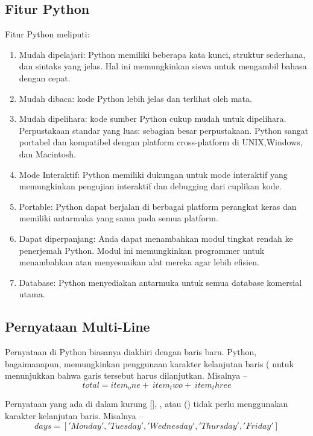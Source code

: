 \subsection{Fitur Python}
Fitur Python meliputi:
	\begin{enumerate}
		\item Mudah dipelajari: Python memiliki beberapa kata kunci, struktur sederhana, dan sintaks yang jelas. Hal ini 			memungkinkan siswa untuk mengambil bahasa dengan cepat.
		\item  Mudah dibaca: kode Python lebih jelas dan terlihat oleh mata.
		\item  Mudah dipelihara: kode sumber Python cukup mudah untuk dipelihara. Perpustakaan standar yang luas: sebagian besar 		perpustakaan. Python sangat portabel dan kompatibel dengan
		platform cross-platform di UNIX,Windows, dan Macintosh.
		\item Mode Interaktif: Python memiliki dukungan untuk mode interaktif yang memungkinkan pengujian interaktif dan 			debugging dari 	cuplikan kode.
		\item Portable: Python dapat berjalan di berbagai platform perangkat keras dan memiliki antarmuka yang sama pada semua 			platform.
		\item  Dapat diperpanjang: Anda dapat menambahkan modul tingkat rendah ke penerjemah Python. Modul ini memungkinkan 			programmer untuk menambahkan atau menyesuaikan
		alat mereka agar lebih efisien.
		\item  Database: Python menyediakan antarmuka untuk semua database komersial utama.
	\end{enumerate}


\subsection {Pernyataan Multi-Line}
Pernyataan di Python biasanya diakhiri dengan baris baru. Python, bagaimanapun, memungkinkan penggunaan karakter kelanjutan baris (\) untuk menunjukkan bahwa garis tersebut harus dilanjutkan. Misalnya –
	\begin {equation}
	total = item_one + \
		item_two + \
		item_three
	\end {equation}

Pernyataan yang ada di dalam kurung [], {}, atau () tidak perlu menggunakan karakter kelanjutan baris. Misalnya –
	\begin {equation}
	days = ['Monday', 'Tuesday', 'Wednesday',
		'Thursday', 'Friday']
	\end {equation}

